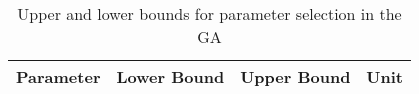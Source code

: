 \documentclass{article}
\begin{document}
	\begin{table}[]
		\centering
		\begin{tabular}{l|r|r|l}
			Parameter & Lower Bound & Upper Bound & Unit \\
			\hline
			
		\end{tabular}
		\caption{Upper and lower bounds for parameter selection in the GA}
	\end{table}
\end{document}
